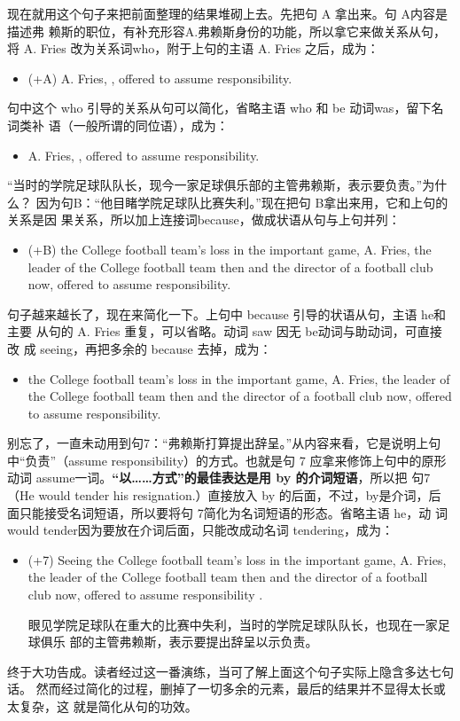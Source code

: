 现在就用这个句子来把前面整理的结果堆砌上去。先把句 A 拿出来。句 A内容是描述弗
赖斯的职位，有补充形容A.弗赖斯身份的功能，所以拿它来做关系从句，将 A. Fries
改为关系词who，附于上句的主语 A. Fries 之后，成为：
\begin{itemize}
\item (+A) A. Fries, , offered to assume responsibility.
\end{itemize}
句中这个 who 引导的关系从句可以简化，省略主语 who 和 be 动词was，留下名词类补
语（一般所谓的同位语），成为：
\begin{itemize}
\item A. Fries, , offered to assume responsibility.
\end{itemize}
“当时的学院足球队队长，现今一家足球俱乐部的主管弗赖斯，表示要负责。”为什么？
因为句B：“他目睹学院足球队比赛失利。”现在把句 B拿出来用，它和上句的关系是因
果关系，所以加上连接词because，做成状语从句与上句并列：
\begin{itemize}
\item (+B)  the College football team's loss in the important
  game, A. Fries, the leader of the College football team then and the
  director of a football club now, offered to assume responsibility.
\end{itemize}
句子越来越长了，现在来简化一下。上句中 because 引导的状语从句，主语 he和主要
从句的 A. Fries 重复，可以省略。动词 saw 因无 be动词与助动词，可直接改
成 seeing，再把多余的 because 去掉，成为：
\begin{itemize}
\item {} the College football team's loss in the important game, A. Fries,
  the leader of the College football team then and the director of a
  football club now, offered to assume responsibility.
\end{itemize}

别忘了，一直未动用到句7：“弗赖斯打算提出辞呈。”从内容来看，它是说明上句
中“负责”（assume responsibility）的方式。也就是句 7 应拿来修饰上句中的原形
动词 assume一词。\textbf{“以……方式”的最佳表达是用 by 的介词短语}，所以把
句7（He would tender his resignation.）直接放入 by 的后面，不过，by是介词，后
面只能接受名词短语，所以要将句 7简化为名词短语的形态。省略主语 he，动
词 would tender因为要放在介词后面，只能改成动名词 tendering，成为：
\begin{itemize}
\item (+7) Seeing the College football team's loss in the important game, A.
  Fries, the leader of the College football team then and the director of a
  football club now, offered to assume responsibility .

  眼见学院足球队在重大的比赛中失利，当时的学院足球队队长，也现在一家足球俱乐
  部的主管弗赖斯，表示要提出辞呈以示负责。
\end{itemize}
终于大功告成。读者经过这一番演练，当可了解上面这个句子实际上隐含多达七句话。
然而经过简化的过程，删掉了一切多余的元素，最后的结果并不显得太长或太复杂，这
就是简化从句的功效。

